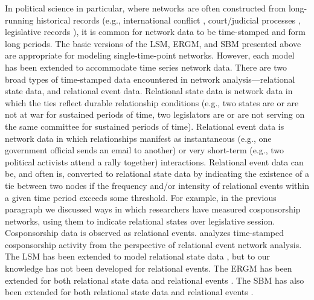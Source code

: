 \documentclass[fleqn,12pt]{wlscirep}
\begin{document}
In political science in particular, where networks are often constructed from long-running historical records (e.g., international conflict \citep{li2017three}, court/judicial processes \citep{box2014evolution}, legislative records \citep{ringe2013bridging}), it is common for network data to be time-stamped and form long periods. The basic versions of the LSM, ERGM, and SBM presented above are appropriate for modeling single-time-point networks. However, each model has been extended to accommodate time series network data. There are two broad types of time-stamped data encountered in network analysis---relational state data, and relational event data. Relational state data is network data in which the ties reflect durable relationship conditions (e.g., two states are or are not at war for sustained periods of time, two legislators are or are not serving on the same committee for sustained periods of time). Relational event data is network data in which relationships manifest as instantaneous (e.g., one government official sends an email to another) or very short-term (e.g., two political activists attend a rally together) interactions. Relational event data can be, and often is, converted to relational state data by indicating the existence of a tie between two nodes if the frequency and/or intensity of relational events within a given time period exceeds some threshold. For example, in the previous paragraph we discussed ways in which researchers have measured cosponsorship networks, using them to indicate relational states over legislative session. Cosponsorship data is observed as relational events. \cite{brandenberger2018trading} analyzes time-stamped cosponsorship activity from the perspective of relational event network analysis. The LSM has been extended to model relational state data \citep{sewell2015latent}, but to our knowledge has not been developed for relational events. The ERGM has been extended for both relational state data \citep{hanneke2010discrete} and relational events \citep{perry2013point}.  The SBM has also been extended for both relational state data \citep{xu2014dynamic} and relational events \citep{dubois2013stochastic}. 
\end{document}
